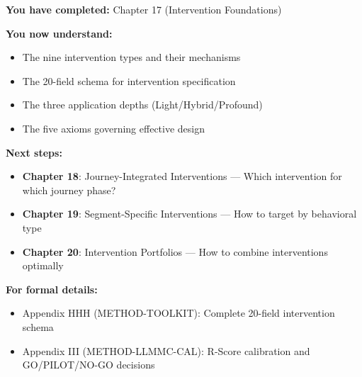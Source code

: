\begin{tcolorbox}[colback=purple!5!white, colframe=purple!75!black,
    title=Reading Path]

\textbf{You have completed:} Chapter 17 (Intervention Foundations)

\textbf{You now understand:}
\begin{itemize}[nosep]
\item The nine intervention types and their mechanisms
\item The 20-field schema for intervention specification
\item The three application depths (Light/Hybrid/Profound)
\item The five axioms governing effective design
\end{itemize}

\textbf{Next steps:}
\begin{itemize}[nosep]
\item \textbf{Chapter 18}: Journey-Integrated Interventions --- Which intervention for which journey phase?
\item \textbf{Chapter 19}: Segment-Specific Interventions --- How to target by behavioral type
\item \textbf{Chapter 20}: Intervention Portfolios --- How to combine interventions optimally
\end{itemize}

\textbf{For formal details:}
\begin{itemize}[nosep]
\item Appendix HHH (METHOD-TOOLKIT): Complete 20-field intervention schema
\item Appendix III (METHOD-LLMMC-CAL): R-Score calibration and GO/PILOT/NO-GO decisions
\end{itemize}
\end{tcolorbox}


